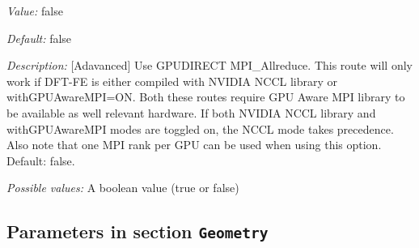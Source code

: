 \begin{itemize}
{\it Value:} false


{\it Default:} false


{\it Description:} [Adavanced] Use GPUDIRECT MPI\_Allreduce. This route will only work if DFT-FE is either compiled with NVIDIA NCCL library or withGPUAwareMPI=ON. Both these routes require GPU Aware MPI library to be available as well relevant hardware. If both NVIDIA NCCL library and withGPUAwareMPI modes are toggled on, the NCCL mode takes precedence. Also note that one MPI rank per GPU can be used when using this option. Default: false.


{\it Possible values:} A boolean value (true or false)
\end{itemize}

\subsection{Parameters in section \tt Geometry}
\label{parameters:Geometry}

